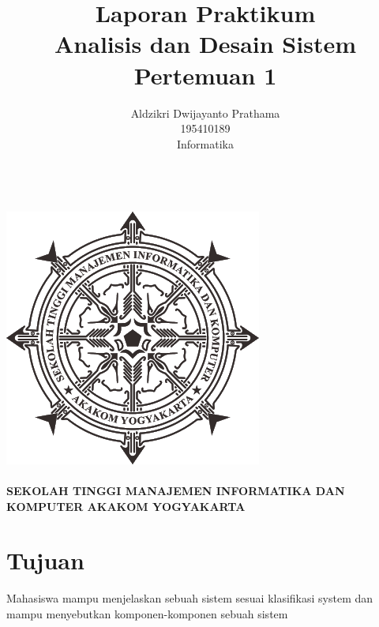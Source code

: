 \documentclass[a4paper,12pt]{article}
\begin{document}
\title{ {\Large Laporan Praktikum}\\ Analisis dan Desain Sistem\\{\Large Pertemuan 1}}

\author{Aldzikri Dwijayanto Prathama
    \\195410189
    \\Informatika}
\makeatletter
\begin{titlepage}
    \begin{center}
        {\huge \bfseries \@title}\\[14ex]
        \includegraphics[scale=.8]{logo}\\[4ex]
        {\large \@author}\\[12ex]
        {\large \bfseries {SEKOLAH TINGGI MANAJEMEN INFORMATIKA DAN KOMPUTER
            AKAKOM YOGYAKARTA}}
    \end{center}


\end{titlepage}
\makeatother
\newpage
\tableofcontents
\newpage

\section{Tujuan}
Mahasiswa mampu menjelaskan sebuah sistem sesuai klasifikasi system dan mampu menyebutkan komponen-komponen sebuah
sistem
\end{document}
